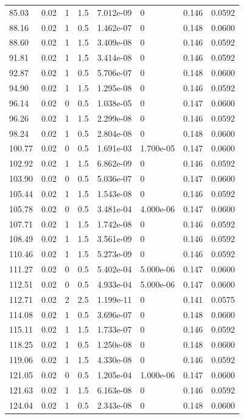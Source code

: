 \documentclass[preview]{standalone}
\begin{document}
{{{\begin{tabular}{L{1.2cm}C{1.2cm} C{0.3cm}C{0.5cm} C{1.4cm}C{1.4cm} C{1.4cm}C{1.4cm}}
  85.03  &  0.02  & 1     & 1.5 &  7.012e-09  & 0  & 0.146 &  0.0592   \\ 
  88.16  &  0.02  & 1     & 0.5 &  1.462e-07  & 0  & 0.148 &  0.0600   \\ 
  88.60  &  0.02  & 1     & 1.5 &  3.409e-08  & 0  & 0.146 &  0.0592   \\ 
  91.81  &  0.02  & 1     & 1.5 &  3.414e-08  & 0  & 0.146 &  0.0592   \\ 
  92.87  &  0.02  & 1     & 0.5 &  5.706e-07  & 0  & 0.148 &  0.0600   \\ 
  94.90  &  0.02  & 1     & 1.5 &  1.295e-08  & 0  & 0.146 &  0.0592   \\ 
  96.14  &  0.02  & 0     & 0.5 &  1.038e-05  & 0  & 0.147 &  0.0600   \\ 
  96.26  &  0.02  & 1     & 1.5 &  2.299e-08  & 0  & 0.146 &  0.0592   \\ 
  98.24  &  0.02  & 1     & 0.5 &  2.804e-08  & 0  & 0.148 &  0.0600   \\ 
  100.77  &  0.02  & 0     & 0.5 &  1.691e-03  & 1.700e-05  & 0.147 &  0.0600   \\ 
  102.92  &  0.02  & 1     & 1.5 &  6.862e-09  & 0  & 0.146 &  0.0592   \\ 
  103.90  &  0.02  & 0     & 0.5 &  5.036e-07  & 0  & 0.147 &  0.0600   \\ 
  105.44  &  0.02  & 1     & 1.5 &  1.543e-08  & 0  & 0.146 &  0.0592   \\ 
  105.78  &  0.02  & 0     & 0.5 &  3.481e-04  & 4.000e-06  & 0.147 &  0.0600   \\ 
  107.71  &  0.02  & 1     & 1.5 &  1.742e-08  & 0  & 0.146 &  0.0592   \\ 
  108.49  &  0.02  & 1     & 1.5 &  3.561e-09  & 0  & 0.146 &  0.0592   \\ 
  110.46  &  0.02  & 1     & 1.5 &  5.273e-09  & 0  & 0.146 &  0.0592   \\ 
  111.27  &  0.02  & 0     & 0.5 &  5.402e-04  & 5.000e-06  & 0.147 &  0.0600   \\ 
  112.51  &  0.02  & 0     & 0.5 &  4.933e-04  & 5.000e-06  & 0.147 &  0.0600   \\ 
  112.71  &  0.02  & 2     & 2.5 &  1.199e-11  & 0  & 0.141 &  0.0575   \\ 
  114.08  &  0.02  & 1     & 0.5 &  3.696e-07  & 0  & 0.148 &  0.0600   \\ 
  115.11  &  0.02  & 1     & 1.5 &  1.733e-07  & 0  & 0.146 &  0.0592   \\ 
  118.25  &  0.02  & 1     & 0.5 &  1.250e-08  & 0  & 0.148 &  0.0600   \\ 
  119.06  &  0.02  & 1     & 1.5 &  4.330e-08  & 0  & 0.146 &  0.0592   \\ 
  121.05  &  0.02  & 0     & 0.5 &  1.205e-04  & 1.000e-06  & 0.147 &  0.0600   \\ 
  121.63  &  0.02  & 1     & 1.5 &  6.163e-08  & 0  & 0.146 &  0.0592   \\ 
  124.04  &  0.02  & 1     & 0.5 &  2.343e-08  & 0  & 0.148 &  0.0600   \\ 
\hline 
\end{tabular} 

}}}
\end{document}
